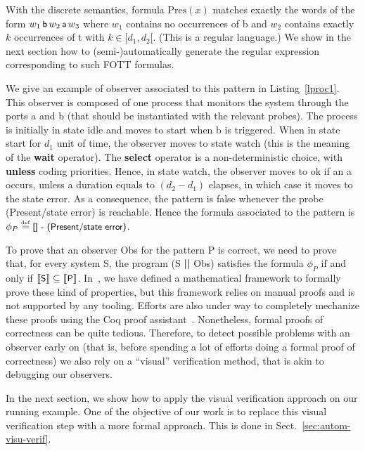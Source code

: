 \documentclass[a4paper]{scrartcl}
\def\code#1{\textsf{\small\bfseries #1}}
\def\vars#1{\textsf{\small #1}}
\newcommand{\sem}[1]{[\kern-.5mm[{#1}]\kern-.5mm]}
\newcommand{\eqdef}{\ensuremath{\overset{\text{\tiny def}}{=}}}
\begin{document}
With the discrete semantics, formula $\mathrm{Pres}(x)$ matches
exactly the words of the form $w_1 \, \vars{b} \, w_2 \, \vars{a} \,
w_3$ where $w_1$ contains no occurrences of \vars{b} and $w_2$
contains exactly $k$ occurrences of \vars{t} with $k \in [d_1,
d_2[$. (This is a regular language.) We show in the next section how
to (semi-)automatically generate the regular expression corresponding
to such FOTT formulas.

We give an example of observer associated to this pattern in
Listing~\ref{lproc1}. This observer is composed of one process that
monitors the system through the ports \vars{a} and \vars{b} (that
should be instantiated with the relevant probes). The process is
initially in state \vars{idle} and moves to \vars{start} when \vars{b}
is triggered. When in state \vars{start} for $d_1$ unit of time, the
observer moves to state \vars{watch} (this is the meaning of the
\code{wait} operator). The \code{select} operator is a
non-deterministic choice, with \code{unless} coding priorities. Hence,
in state \vars{watch}, the observer moves to \vars{ok} if an \vars{a}
occurs, unless a duration equals to $(d_2-d_1)$ elapses, in which case
it moves to the state \vars{error}. As a consequence, the pattern is
false whenever the probe \vars{(Present/state error)} is
reachable. Hence the formula associated to the pattern is $\phi_P
\eqdef \vars{[] - (Present/state error)}$.

To prove that an observer \vars{Obs} for the pattern \vars{P} is
correct, we need to prove that, for every system \vars{S}, the program
(\vars{S} \code{||} \vars{Obs}) satisfies the formula $\phi_{P}$ if
and only if $\sem{\vars{S}} \subseteq
\sem{\vars{P}}$. In~\cite{FRP11}, we have defined a mathematical
framework to formally prove these kind of properties, but this
framework relies on manual proofs and is not supported by any
tooling. Efforts are also under way to completely mechanize these
proofs using the Coq proof assistant~\cite{garnacho12}. Nonetheless,
formal proofs of correctness can be quite tedious. Therefore, to
detect possible problems with an observer early on (that is, before
spending a lot of efforts doing a formal proof of correctness) we also
rely on a ``visual'' verification method, that is akin to debugging
our observers.

In the next section, we show how to apply the visual verification
approach on our running example. One of the objective of our work is
to replace this visual verification step with a more formal
approach. This is done in Sect.~\ref{sec:autom-visu-verif}.
\end{document}
